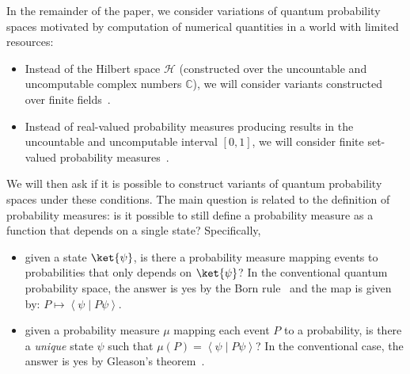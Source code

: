 \documentclass{article}
\theoremstyle{remark}
\newcommand{\Hilb}{\mathcal{H}}
\newcommand{\ip}[2]{\ensuremath{\left\langle{#1}\middle\vert{#2}\right\rangle}}
\begin{document}
In the remainder of the paper, we consider variations of quantum
probability spaces motivated by computation of numerical quantities in
a world with limited resources:
\begin{itemize}
\item Instead of the Hilbert space $\Hilb$ (constructed over the uncountable
and uncomputable complex numbers $\mathbb{C}$), we will consider
variants constructed over finite fields~\cite{DQT2014,geometry2013}. 
\item Instead of real-valued probability measures producing results in
  the uncountable and uncomputable interval $[0,1]$, we will consider
  finite set-valued probability measures~\cite{PuriRalescu1983}.
\end{itemize}
We will then ask if it is possible to construct variants of quantum
probability spaces under these conditions. The main question is
related to the definition of probability measures: is it possible to
still define a probability measure as a function that depends on a
single state? Specifically,
\begin{itemize}
\item given a state $\ket{\psi}$, is there a probability measure
  mapping events to probabilities that only depends on $\ket{\psi}$?
  In the conventional quantum probability space, the answer is yes by
  the Born rule~\cite{Born1983,Mermin2007} and the map is given by:
  $P \mapsto \ip{\psi}{P\psi}$.
\item given a probability measure $\mu$
  mapping each event $P$
  to a probability, is there a \emph{unique} state $\psi$
  such that $\mu(P)
  =
  \ip{\psi}{P\psi}$? In the conventional case, the answer is yes by
  Gleason's
  theorem~\cite{gleason1957,peres1995quantum,Redhead1987-REDINA}.
\end{itemize}
\end{document}
